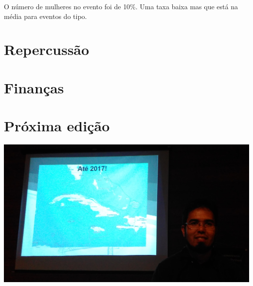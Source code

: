 \documentclass[12pt]{article}
\begin{document}
O número de mulheres no evento foi de 10\%. Uma taxa baixa mas que está na média
para eventos do tipo.

\newpage

\section*{Repercussão}

\newpage

\section*{Finanças}

\newpage

\section*{Próxima edição}

\noindent  %
\includegraphics[width=\textwidth]{2017.jpg}

\newpage
\end{document}
